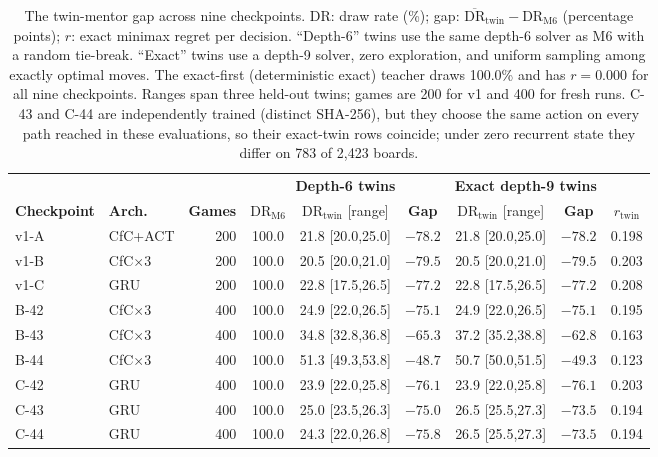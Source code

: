 \documentclass[conference]{IEEEtran}
\newcommand{\DR}{\text{DR}}
\begin{document}
\begin{table}[t]
\centering
\caption{The twin-mentor gap across nine checkpoints. DR: draw rate (\%); gap: $\overline{\DR}_{\text{twin}}-\DR_{\text{M6}}$ (percentage points); $r$: exact minimax regret per decision. ``Depth-6'' twins use the same depth-6 solver as M6 with a random tie-break. ``Exact'' twins use a depth-9 solver, zero exploration, and uniform sampling among exactly optimal moves. The exact-first (deterministic exact) teacher draws 100.0\% and has $r=0.000$ for all nine checkpoints. Ranges span three held-out twins; games are 200 for v1 and 400 for fresh runs. C-43 and C-44 are independently trained (distinct SHA-256), but they choose the same action on every path reached in these evaluations, so their exact-twin rows coincide; under zero recurrent state they differ on 783 of 2{,}423 boards.}
\label{tab:main}
\setlength{\tabcolsep}{3.2pt}
\small
\begin{tabular*}{\textwidth}{@{\extracolsep{\fill}}llrcccccc@{}}
\toprule
& & & \multicolumn{3}{c}{\textbf{Depth-6 twins}} & \multicolumn{2}{c}{\textbf{Exact depth-9 twins}}\\
\cmidrule(lr){4-6}\cmidrule(lr){7-8}
\textbf{Checkpoint} & \textbf{Arch.} & \textbf{Games} & $\DR_{\text{M6}}$ & $\DR_{\text{twin}}$ [range] & \textbf{Gap} & $\DR_{\text{twin}}$ [range] & \textbf{Gap} & $r_{\text{twin}}$ \\
\midrule
v1-A & CfC+ACT & 200 & 100.0 & 21.8 [20.0,25.0] & $-78.2$ & 21.8 [20.0,25.0] & $-78.2$ & 0.198 \\
v1-B & CfC$\times$3 & 200 & 100.0 & 20.5 [20.0,21.0] & $-79.5$ & 20.5 [20.0,21.0] & $-79.5$ & 0.203 \\
v1-C & GRU & 200 & 100.0 & 22.8 [17.5,26.5] & $-77.2$ & 22.8 [17.5,26.5] & $-77.2$ & 0.208 \\
B-42 & CfC$\times$3 & 400 & 100.0 & 24.9 [22.0,26.5] & $-75.1$ & 24.9 [22.0,26.5] & $-75.1$ & 0.195 \\
B-43 & CfC$\times$3 & 400 & 100.0 & 34.8 [32.8,36.8] & $-65.3$ & 37.2 [35.2,38.8] & $-62.8$ & 0.163 \\
B-44 & CfC$\times$3 & 400 & 100.0 & 51.3 [49.3,53.8] & $-48.7$ & 50.7 [50.0,51.5] & $-49.3$ & 0.123 \\
C-42 & GRU & 400 & 100.0 & 23.9 [22.0,25.8] & $-76.1$ & 23.9 [22.0,25.8] & $-76.1$ & 0.203 \\
C-43 & GRU & 400 & 100.0 & 25.0 [23.5,26.3] & $-75.0$ & 26.5 [25.5,27.3] & $-73.5$ & 0.194 \\
C-44 & GRU & 400 & 100.0 & 24.3 [22.0,26.8] & $-75.8$ & 26.5 [25.5,27.3] & $-73.5$ & 0.194 \\
\bottomrule
\end{tabular*}
\end{table}
\end{document}
